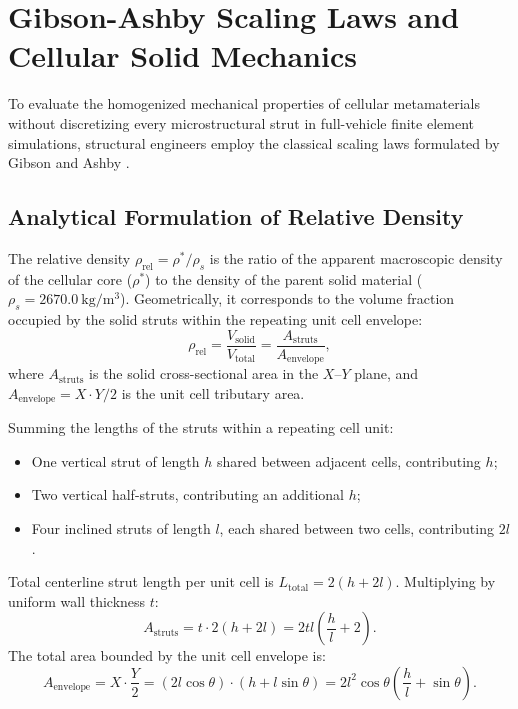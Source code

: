 \section{Gibson-Ashby Scaling Laws and Cellular Solid Mechanics}
\label{sec:gibson_ashby}

To evaluate the homogenized mechanical properties of cellular metamaterials without discretizing every microstructural strut in full-vehicle finite element simulations, structural engineers employ the classical scaling laws formulated by Gibson and Ashby \cite{gibson1997}.

\subsection{Analytical Formulation of Relative Density}
\label{subsec:relative_density}

The relative density $\rho_{\text{rel}} = \rho^* / \rho_s$ is the ratio of the apparent macroscopic density of the cellular core ($\rho^*$) to the density of the parent solid material ($\rho_s = \SI{2670.0}{\kilo\gram\per\meter^3}$). Geometrically, it corresponds to the volume fraction occupied by the solid struts within the repeating unit cell envelope:
\begin{equation}
\rho_{\text{rel}} = \frac{V_{\text{solid}}}{V_{\text{total}}} = \frac{A_{\text{struts}}}{A_{\text{envelope}}},
\label{eq:relative_density_def}
\end{equation}
where $A_{\text{struts}}$ is the solid cross-sectional area in the $X\text{--}Y$ plane, and $A_{\text{envelope}} = X \cdot Y / 2$ is the unit cell tributary area.

Summing the lengths of the struts within a repeating cell unit:
\begin{itemize}
\item One vertical strut of length $h$ shared between adjacent cells, contributing $h$;
\item Two vertical half-struts, contributing an additional $h$;
\item Four inclined struts of length $l$, each shared between two cells, contributing $2 l$.
\end{itemize}
Total centerline strut length per unit cell is $L_{\text{total}} = 2(h + 2l)$. Multiplying by uniform wall thickness $t$:
\begin{equation}
A_{\text{struts}} = t \cdot 2(h + 2l) = 2 t l \left( \frac{h}{l} + 2 \right).
\label{eq:area_struts}
\end{equation}
The total area bounded by the unit cell envelope is:
\begin{equation}
A_{\text{envelope}} = X \cdot \frac{Y}{2} = (2 l \cos\theta) \cdot (h + l \sin\theta) = 2 l^2 \cos\theta \left( \frac{h}{l} + \sin\theta \right).
\label{eq:area_envelope}
\end{equation}

